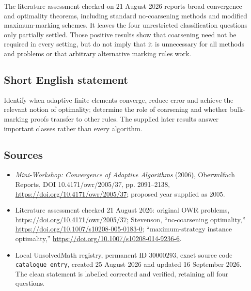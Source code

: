 \documentclass[11pt]{article}
\begin{document}
The literature assessment checked on 21 August 2026 reports broad convergence and optimality theorems, including standard no-coarsening methods and modified maximum-marking schemes. It leaves the four unrestricted classification questions only partially settled. Those positive results show that coarsening need not be required in every setting, but do not imply that it is unnecessary for all methods and problems or that arbitrary alternative marking rules work.
\subsection{Short English statement}
Identify when adaptive finite elements converge, reduce error and achieve the relevant notion of optimality; determine the role of coarsening and whether bulk-marking proofs transfer to other rules. The supplied later results answer important classes rather than every algorithm.
\subsection{Sources}
\begin{itemize}
\item \emph{Mini-Workshop: Convergence of Adaptive Algorithms} (2006), Oberwolfach Reports, DOI 10.4171/owr/2005/37, pp. 2091--2138, \url{https://doi.org/10.4171/owr/2005/37}; proposed year supplied as 2005.
\item Literature assessment checked 21 August 2026: original OWR problems, \url{https://doi.org/10.4171/owr/2005/37}; Stevenson, ``no-coarsening optimality,'' \url{https://doi.org/10.1007/s10208-005-0183-0}; ``maximum-strategy instance optimality,'' \url{https://doi.org/10.1007/s10208-014-9236-6}.
\item Local UnsolvedMath registry, permanent ID $30000293$, exact source code \texttt{catalogue entry}, created 25 August 2026 and updated 16 September 2026. The clean statement is labelled corrected and verified, retaining all four questions.
\end{itemize}
\end{document}
